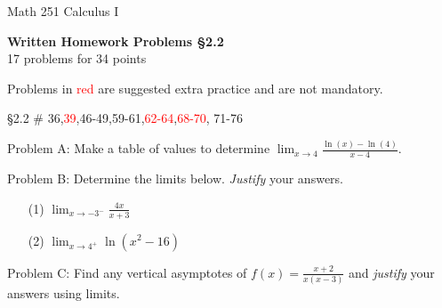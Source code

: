 \documentclass[11pt]{report}
\theoremstyle{plain}
\newcommand{\opt}[1]{\textcolor{red}{#1}}
\begin{document}
\hfill Math 251 Calculus I
\begin{center}
\Large{\textbf{Written Homework Problems \S 2.2}} \\
17 problems for 34 points\\
\end{center}


Problems in \textcolor{red}{red} are suggested extra practice and are not mandatory.\\

\begin{description}
\item{\S 2.2} \# 36,\opt{39},46-49,59-61,\opt{62-64},\opt{68-70}, 71-76 \\

\item Problem A: Make a table of values to determine $\displaystyle \lim_{x \to 4} \frac{\ln(x)-\ln(4)}{x-4}.$

\item Problem B: Determine the limits below. \emph{Justify} your answers.\\
\begin{enumerate}
\item[(1)] $\displaystyle{\lim_{x \to -3^-}\frac{4x}{x+3}}$
\item[(2)] $\displaystyle{\lim_{x \to 4^+} \ln(x^2-16)}$
\end{enumerate}
\item Problem C: Find any vertical asymptotes of $\displaystyle f(x)=\frac{x+2}{x(x-3)}$ and \emph{justify} your answers using limits.

\end{description}
\end{document}

